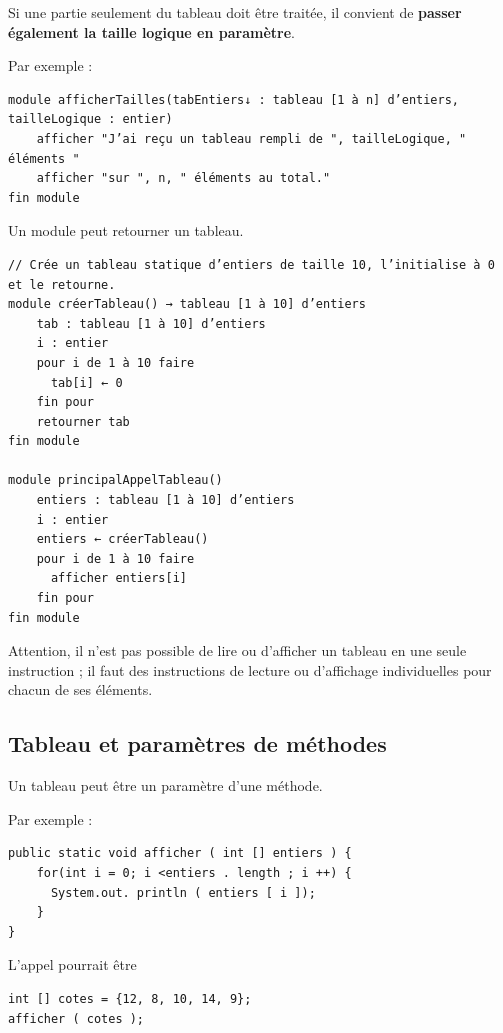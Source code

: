 \documentclass[11pt,a4paper]{article}
\begin{document}
            \par
        
        Si une partie seulement du tableau doit \^etre trait\'ee, il convient de \textbf{passer \'egalement
        la taille logique en param\`etre}.
      
            \par
        Par exemple :
            \par
        \begin{verbatim}
module afficherTailles(tabEntiers↓ : tableau [1 à n] d’entiers, tailleLogique : entier)
    afficher "J’ai reçu un tableau rempli de ", tailleLogique, " éléments "
    afficher "sur ", n, " éléments au total."
fin module
      \end{verbatim}
        Un module peut retourner un tableau.
      
            \par
        \begin{verbatim}
// Crée un tableau statique d’entiers de taille 10, l’initialise à 0 et le retourne.
module créerTableau() → tableau [1 à 10] d’entiers
    tab : tableau [1 à 10] d’entiers
    i : entier
    pour i de 1 à 10 faire
      tab[i] ← 0
    fin pour
    retourner tab
fin module

module principalAppelTableau()
    entiers : tableau [1 à 10] d’entiers
    i : entier
    entiers ← créerTableau()
    pour i de 1 à 10 faire
      afficher entiers[i]
    fin pour
fin module
      \end{verbatim}
        Attention, il n'est pas possible de lire ou d'afficher un tableau en une seule instruction ; il faut des
        instructions de lecture ou d'affichage individuelles pour chacun de ses \'el\'ements.
      
            \par
        \subsection{Tableau et param\`etres de m\'ethodes}Un tableau peut \^etre un param\`etre d'une m\'ethode.
            \par
        Par exemple :
            \par
        \begin{verbatim}
public static void afficher ( int [] entiers ) {
    for(int i = 0; i <entiers . length ; i ++) {
      System.out. println ( entiers [ i ]);
    }
}\end{verbatim}L'appel pourrait \^etre
            \par
        \begin{verbatim}
int [] cotes = {12, 8, 10, 14, 9};
afficher ( cotes );
      \end{verbatim}
			
\end{document}
